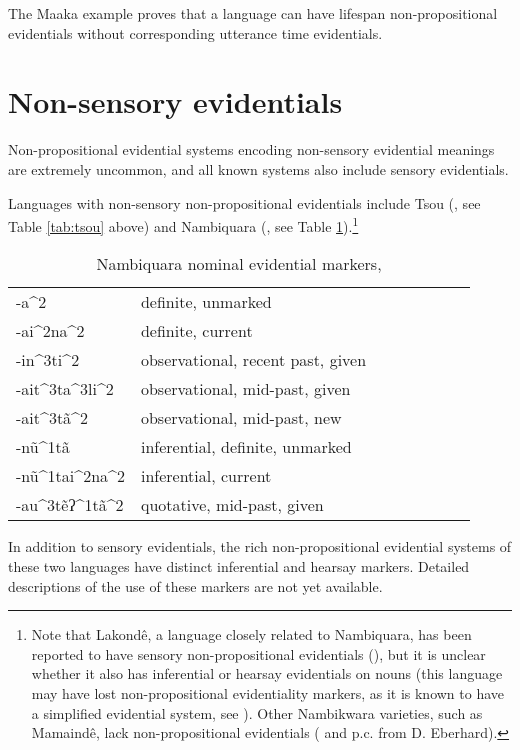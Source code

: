 \documentclass[oneside,a4paper,11pt]{article}
\newcommand{\ipa}[1]{{\phon \mbox{#1}}} %
\begin{document}
 The Maaka example proves that a language can have lifespan non-propositional evidentials without corresponding utterance time evidentials.
  
\section{Non-sensory evidentials} \label{sec:nonsens}
Non-propositional evidential systems encoding non-sensory evidential meanings are extremely uncommon, and all known systems also include sensory evidentials.

Languages with non-sensory non-propositional evidentials include Tsou (\citealt{yang00tsou.case}, see Table \ref{tab:tsou} above) and Nambiquara (\citealt{lowe99nambiquara}, see Table \ref{tab:nambiquara}).\footnote{Note that Lakondê, a language closely related to Nambiquara, has been reported to have sensory non-propositional evidentials (\citealt[248-9]{wetzels06lakonde}), but it is unclear whether it also has inferential or hearsay evidentials on nouns (this language may have lost non-propositional evidentiality markers, as it is known to have a simplified evidential system, see \citet[274-5]{aikhenvald12amazon}). Other Nambikwara varieties, such as Mamaindê, lack non-propositional evidentials (\citealt{eberhard09nambikwara} and p.c. from D. Eberhard).}  


 \begin{table}[H]
 \caption{Nambiquara nominal evidential markers, \citet[282]{lowe99nambiquara} } \centering \label{tab:nambiquara}
\begin{tabular}{llllllll}
\toprule
\ipa{-a^2} & definite, unmarked \\
\ipa{-ai^2na^2} & definite, current \\
\ipa{-in^3ti^2} & observational, recent past, given \\
\ipa{-ait^3ta^3li^2} & observational, mid-past, given \\
\ipa{-ait^3tã^2} & observational, mid-past, new \\
\ipa{-nũ^1tã} & inferential, definite, unmarked \\
\ipa{-nũ^1tai^2na^2} & inferential, current \\
\ipa{-au^3tẽʔ^1tã^2} & quotative, mid-past, given \\
\bottomrule
\end{tabular}
\end{table}

In addition to sensory evidentials, the rich non-propositional evidential systems of these two languages have distinct inferential and hearsay markers. Detailed descriptions of the use of these markers are not yet available.
\end{document}
